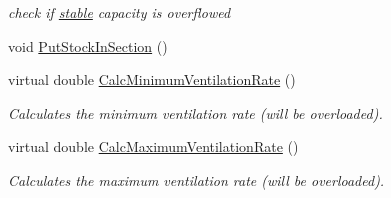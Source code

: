 \begin{DoxyCompactItemize}
\begin{DoxyCompactList}\small\item\em check if \hyperlink{classstable}{stable} capacity is overflowed \item\end{DoxyCompactList}\item 
void \hyperlink{classpigstable_ab314ba2d59e6a782d7bf8dcd5a367a0a}{PutStockInSection} ()
\item 
virtual double \hyperlink{classpigstable_a9dc314d78207fccac503793e8fa4885d}{CalcMinimumVentilationRate} ()
\begin{DoxyCompactList}\small\item\em Calculates the minimum ventilation rate (will be overloaded). \item\end{DoxyCompactList}\item 
virtual double \hyperlink{classpigstable_a1695437806e4b3d9a68c0ec872a4f846}{CalcMaximumVentilationRate} ()
\begin{DoxyCompactList}\small\item\em Calculates the maximum ventilation rate (will be overloaded). \item\end{DoxyCompactList}\end{DoxyCompactItemize}



